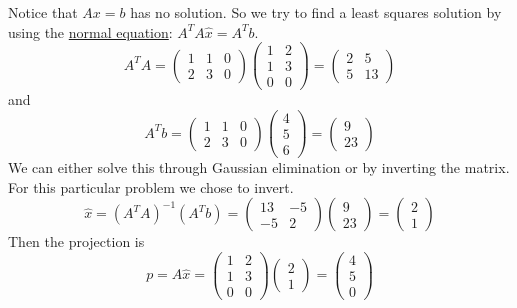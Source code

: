 \documentclass[reqno]{amsart}
\theoremstyle{definition}
\begin{document}
\begin{itemize}
Notice that $Ax = b$ has no solution.  So we try to find a least squares solution by using the \underline{normal equation}:
$A^TA\hat{x} = A^Tb$.
%
\begin{equation*}
A^TA = \begin{pmatrix}
1 & 1 & 0\\
2 & 3 & 0
\end{pmatrix} \begin{pmatrix}
1 & 2\\
1 & 3\\
0 & 0
\end{pmatrix} = \begin{pmatrix}
2 & 5\\
5 & 13
\end{pmatrix}
\end{equation*}
%
and
%
\begin{equation*}
A^Tb = \begin{pmatrix}
1 & 1 & 0\\
2 & 3 & 0
\end{pmatrix}\begin{pmatrix}
4\\
5\\
6
\end{pmatrix} = \begin{pmatrix}
9\\
23
\end{pmatrix}
\end{equation*}
%
We can either solve this through Gaussian elimination or by inverting the matrix.  For this particular problem
we chose to invert.
%
\begin{equation*}
\hat{x} = (A^TA)^{-1}(A^Tb) = \begin{pmatrix}
13 & -5\\
-5 & 2
\end{pmatrix}\begin{pmatrix}
9\\
23
\end{pmatrix} = 
\begin{pmatrix}
2\\
1
\end{pmatrix}
\end{equation*}
%
Then the projection is
%
\begin{equation*}
p = A\hat{x} = \begin{pmatrix}
1 & 2\\
1 & 3\\
0 & 0
\end{pmatrix} \begin{pmatrix}
2\\
1
\end{pmatrix} = \begin{pmatrix}
4\\
5\\
0
\end{pmatrix}
\end{equation*}


\end{itemize}
\end{document}
